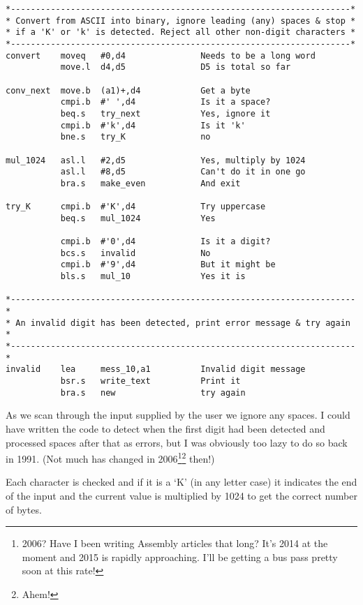 \begin{lstlisting}[firstnumber=last,caption={Dataspace Program - Part 8 - ASCII Conversion}]
*--------------------------------------------------------------------*
* Convert from ASCII into binary, ignore leading (any) spaces & stop *
* if a 'K' or 'k' is detected. Reject all other non-digit characters *
*--------------------------------------------------------------------*
convert    moveq   #0,d4               Needs to be a long word
           move.l  d4,d5               D5 is total so far

conv_next  move.b  (a1)+,d4            Get a byte
           cmpi.b  #' ',d4             Is it a space?
           beq.s   try_next            Yes, ignore it
           cmpi.b  #'k',d4             Is it 'k'
           bne.s   try_K               no

mul_1024   asl.l   #2,d5               Yes, multiply by 1024
           asl.l   #8,d5               Can't do it in one go
           bra.s   make_even           And exit

try_K      cmpi.b  #'K',d4             Try uppercase
           beq.s   mul_1024            Yes

           cmpi.b  #'0',d4             Is it a digit?
           bcs.s   invalid             No
           cmpi.b  #'9',d4             But it might be
           bls.s   mul_10              Yes it is

*---------------------------------------------------------------------*
* An invalid digit has been detected, print error message & try again *
*---------------------------------------------------------------------*
invalid    lea     mess_10,a1          Invalid digit message
           bsr.s   write_text          Print it
           bra.s   new                 try again
\end{lstlisting}

As we scan through the input supplied by the user we ignore any
    spaces. I could have written the code to detect when the first digit had
    been detected and processed spaces after that as errors, but I was
    obviously too lazy to do so back in 1991. (Not much has changed in 2006\footnote{2006? Have I been writing Assembly articles that long? It's 2014 at the moment and 2015 is rapidly approaching. I'll be getting a bus pass pretty soon at this rate!}\footnote{Ahem!} then!)

Each character is checked and if it is a `K' (in any letter case) it
    indicates the end of the input and the current value is multiplied by 1024
    to get the correct number of bytes.

